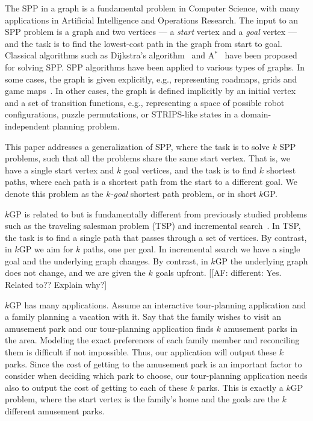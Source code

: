 \documentclass[twoside,11pt]{article}
\newcommand{\kgs}{$k$GP\xspace}
\newcommand{\astar}{A$^*$\xspace}
\newcommand{\roni}[1]{\textbf{[RS:#1]}}
\begin{document}

The \ac{SPP} in a graph is a fundamental problem in Computer
Science, with many applications in Artificial Intelligence and Operations Research.
The input to an SPP problem is a graph and two vertices --- a \emph{start} vertex and a \emph{goal} vertex --- and the task is to find the lowest-cost path in the graph from start to goal.
Classical algorithms such as Dijkstra's algorithm~\cite{DIJ59} and \astar~\cite{hartNR68Astar} have been proposed for solving SPP.
SPP algorithms have been applied to various types of graphs.
In some cases, the graph is given explicitly, e.g., representing roadmaps, grids and game maps~\cite{sturtevant2012benchmarks}.
In other cases, the graph is defined implicitly by an initial vertex and a set of transition functions, e.g., representing a space of possible robot configurations, puzzle permutations, or STRIPS-like states in a domain-independent planning problem.



This paper addresses a generalization of SPP, where the task is to solve $k$ SPP problems, such that all the problems share the same start vertex.
That is, we have a single start vertex and $k$ goal vertices, and the task is to find $k$ shortest paths, where each path is a shortest path from the start to a different goal. 
We denote this problem as the \emph{$k$-goal} shortest path problem, or in short \kgs. %



\kgs is related to but is fundamentally different from previously studied problems such as the traveling salesman problem (TSP) and incremental search~\cite{koenig2004lifelong}.
In TSP, the task is to find a single path that passes through a set of vertices.
By contrast, in \kgs we aim for $k$ paths, one per goal.
In incremental search we have a single goal and the underlying graph changes.
By contrast, in \kgs the underlying graph does not change, and we are given the $k$ goals upfront. %
[[AF: different: Yes. Related to?? Explain why?]

\kgs has many applications. Assume an interactive tour-planning application and a family planning a vacation with it.
Say that the family wishes to visit an amusement park and our tour-planning application finds $k$ amusement parks in the area.
Modeling the exact preferences of each family member and reconciling them is difficult if not impossible.
Thus, our application will output these $k$ parks.
Since the cost of getting to the amusement park is an important factor to consider when deciding which park to choose, our tour-planning application needs also to output the cost of getting to each of these $k$ parks.
This is exactly a \kgs problem, where the start vertex is the family's home and the goals are the $k$ different amusement parks. %
\end{document}
